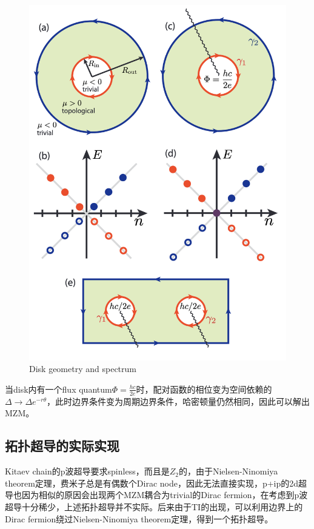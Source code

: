 \documentclass[10pt,openany]{book}
\theoremstyle{thmstyle} %
\theoremstyle{defstyle} %
\theoremstyle{prostyle} %
\begin{document}
\begin{figure}[htbp]
  \centering
  \includegraphics[scale=0.25]{Figures/disk_geometry.png}
  \caption{Disk geometry and spectrum}
\end{figure}
当disk内有一个flux quantum$ \Phi=\frac{h c}{2 e} $时，配对函数的相位变为空间依赖的$ \Delta \rightarrow \Delta e^{-r \theta} $，此时边界条件变为周期边界条件，哈密顿量仍然相同，因此可以解出MZM。
\subsection{拓扑超导的实际实现}
Kitaev chain的p波超导要求spinless，而且是$ Z_2 $的，由于Nielsen-Ninomiya theorem定理，费米子总是有偶数个Dirac node，因此无法直接实现，p+ip的2d超导也因为相似的原因会出现两个MZM耦合为trivial的Dirac fermion，在考虑到p波超导十分稀少，上述拓扑超导并不实际。后来由于TI的出现，可以利用边界上的Dirac fermion绕过Nielsen-Ninomiya theorem定理，得到一个拓扑超导。   
\end{document}
